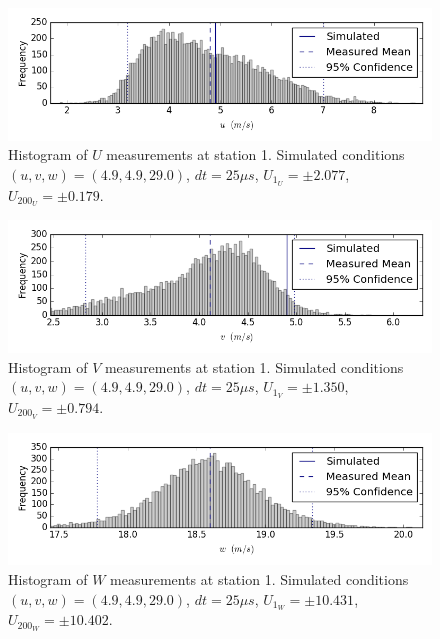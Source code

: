 \begin{figure}[H]
\centering
\includegraphics[width=6in]{figs/Ely_May28th01001/uncertainty_Ely_May28th01001_U}
\caption{Histogram of $U$ measurements at station 1. Simulated conditions 
$(u,v,w)=(4.9, 4.9, 29.0)$, $dt=25 \mu s$, $U_{1_{U}}=\pm 2.077$, 
$U_{200_{U}}=\pm 0.179$.}
\label{fig:uncertainty_Ely_May28th01001_U}
\end{figure}


\begin{figure}[H]
\centering
\includegraphics[width=6in]{figs/Ely_May28th01001/uncertainty_Ely_May28th01001_V}
\caption{Histogram of $V$ measurements at station 1. Simulated conditions 
$(u,v,w)=(4.9, 4.9, 29.0)$, $dt=25 \mu s$, $U_{1_{V}}=\pm 1.350$, 
$U_{200_{V}}=\pm 0.794$.}
\label{fig:uncertainty_Ely_May28th01001_V}
\end{figure}


\begin{figure}[H]
\centering
\includegraphics[width=6in]{figs/Ely_May28th01001/uncertainty_Ely_May28th01001_W}
\caption{Histogram of $W$ measurements at station 1. Simulated conditions 
$(u,v,w)=(4.9, 4.9, 29.0)$, $dt=25 \mu s$, $U_{1_{W}}=\pm 10.431$, 
$U_{200_{W}}=\pm 10.402$.}
\label{fig:uncertainty_Ely_May28th01001_W}
\end{figure}


